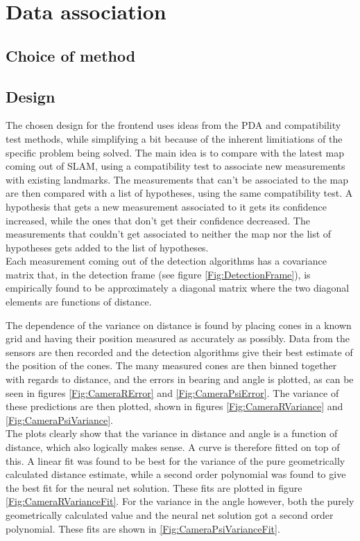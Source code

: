 \section{Data association}
\subsection{Choice of method}

\subsection{Design}
The chosen design for the frontend uses ideas from the PDA and compatibility test methods, while simplifying a bit because of the inherent limitiations of the specific problem being solved. The main idea is to compare with the latest map coming out of SLAM, using a compatibility test to associate new measurements with existing landmarks. The measurements that can't be associated to the map are then compared with a list of hypotheses, using the same compatibility test. A hypothesis that gets a new measurement associated to it gets its confidence increased, while the ones that don't get their confidence decreased. The measurements that couldn't get associated to neither the map nor the list of hypotheses gets added to the list of hypotheses. \\

Each measurement coming out of the detection algorithms has a covariance matrix that, in the detection frame (see figure \ref{Fig:DetectionFrame}), is empirically found to be approximately a diagonal matrix where the two diagonal elements are functions of distance. \\


The dependence of the variance on distance is found by placing cones in a known grid and having their position measured as accurately as possibly. Data from the sensors are then recorded and the detection algorithms give their best estimate of the position of the cones. The many measured cones are then binned together with regards to distance, and the errors in bearing and angle is plotted, as can be seen in figures \ref{Fig:CameraRError} and \ref{Fig:CameraPsiError}. The variance of these predictions are then plotted, shown in figures \ref{Fig:CameraRVariance} and \ref{Fig:CameraPsiVariance}. \\ 

The plots clearly show that the variance in distance and angle is a function of distance, which also logically makes sense. A curve is therefore fitted on top of this. A linear fit was found to be best for the variance of the pure geometrically calculated distance estimate, while a second order polynomial was found to give the best fit for the neural net solution. These fits are plotted in figure \ref{Fig:CameraRVarianceFit}. For the variance in the angle however, both the purely geometrically calculated value and the neural net solution got a second order polynomial. These fits are shown in \ref{Fig:CameraPsiVarianceFit}. \\

